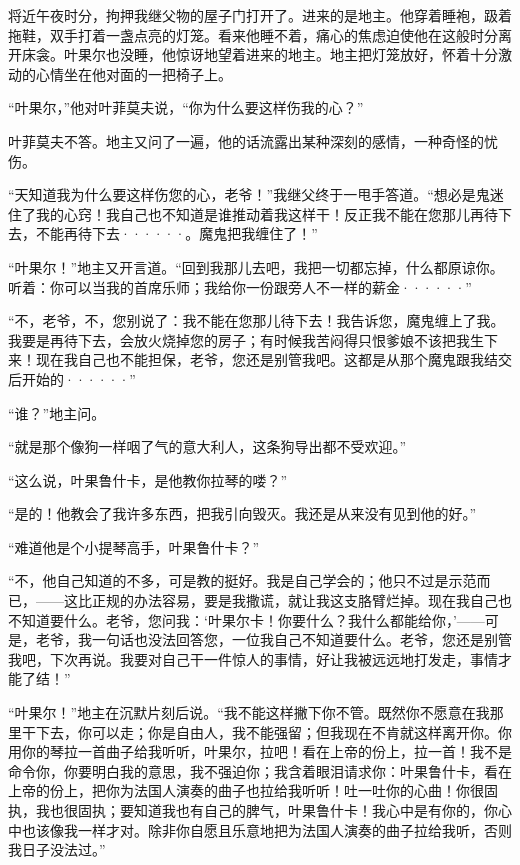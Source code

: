 \documentclass[12pt, UTF8]{ctexbook}
\begin{document}
\par 将近午夜时分，拘押我继父物的屋子门打开了。进来的是地主。他穿着睡袍，趿着拖鞋，双手打着一盏点亮的灯笼。看来他睡不着，痛心的焦虑迫使他在这般时分离开床衾。叶果尔也没睡，他惊讶地望着进来的地主。地主把灯笼放好，怀着十分激动的心情坐在他对面的一把椅子上。
\par “叶果尔，”他对叶菲莫夫说，“你为什么要这样伤我的心？”
\par 叶菲莫夫不答。地主又问了一遍，他的话流露出某种深刻的感情，一种奇怪的忧伤。
\par “天知道我为什么要这样伤您的心，老爷！”我继父终于一甩手答道。“想必是鬼迷住了我的心窍！我自己也不知道是谁推动着我这样干！反正我不能在您那儿再待下去，不能再待下去······。魔鬼把我缠住了！”
\par “叶果尔！”地主又开言道。“回到我那儿去吧，我把一切都忘掉，什么都原谅你。听着：你可以当我的首席乐师；我给你一份跟旁人不一样的薪金······”
\par “不，老爷，不，您别说了：我不能在您那儿待下去！我告诉您，魔鬼缠上了我。我要是再待下去，会放火烧掉您的房子；有时候我苦闷得只恨爹娘不该把我生下来！现在我自己也不能担保，老爷，您还是别管我吧。这都是从那个魔鬼跟我结交后开始的······”
\par “谁？”地主问。
\par “就是那个像狗一样咽了气的意大利人，这条狗导出都不受欢迎。”
\par “这么说，叶果鲁什卡，是他教你拉琴的喽？”
\par “是的！他教会了我许多东西，把我引向毁灭。我还是从来没有见到他的好。”
\par “难道他是个小提琴高手，叶果鲁什卡？”
\par “不，他自己知道的不多，可是教的挺好。我是自己学会的；他只不过是示范而已，——这比正规的办法容易，要是我撒谎，就让我这支胳臂烂掉。现在我自己也不知道要什么。老爷，您问我：‘叶果尔卡！你要什么？我什么都能给你，’——可是，老爷，我一句话也没法回答您，一位我自己不知道要什么。老爷，您还是别管我吧，下次再说。我要对自己干一件惊人的事情，好让我被远远地打发走，事情才能了结！”
\par “叶果尔！”地主在沉默片刻后说。“我不能这样撇下你不管。既然你不愿意在我那里干下去，你可以走；你是自由人，我不能强留；但我现在不肯就这样离开你。你用你的琴拉一首曲子给我听听，叶果尔，拉吧！看在上帝的份上，拉一首！我不是命令你，你要明白我的意思，我不强迫你；我含着眼泪请求你：叶果鲁什卡，看在上帝的份上，把你为法国人演奏的曲子也拉给我听听！吐一吐你的心曲！你很固执，我也很固执；要知道我也有自己的脾气，叶果鲁什卡！我心中是有你的，你心中也该像我一样才对。除非你自愿且乐意地把为法国人演奏的曲子拉给我听，否则我日子没法过。”
\end{document}
